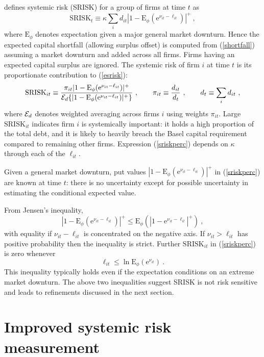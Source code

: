\documentclass[12pt]{article}
\newcommand{\E}{\mathrm{E}}
\newcommand{\e}{\mathrm{e}}
\newcommand{\Ex}{{\cal E}}
\newcommand{\Es}{\E_\phi}
\newcommand{\eref}[1]{(\ref{#1})}
\newcommand{\cq}{\ , \qquad}
\newcommand{\be}[1]{\begin{equation}\label{#1}}
\newcommand{\ee}{\end{equation}}
\begin{document}
 \cite{brownlees2015} defines  systemic risk (SRISK) for a group of firms  at time $t$ as
\be{esrisk}
\mathrm{SRISK}_t\equiv\kappa\sum_i d_{it}\left|1-\Es(\e^{\nu_{it}-\ell_{it}})\right|^+ \ ,
\ee
where  $\Es$ denotes expectation given a major general market downturn. Hence the expected capital shortfall (allowing surplus offset) is computed from \eref{shortfall} assuming a market downturn and added across all firms. Firms having an expected capital surplus are ignored. The systemic risk of firm $i$ at time $t$ is its proportionate contribution to \eref{esrisk}:
 \be{sriskperc}
 \mathrm{SRISK}_{it}\equiv \frac{\pi_{it}|1-\Es(\e^{\nu_{it}-\ell_{it}})|^+}{\Ex_d\{|1-\Es(\e^{\nu_{it}-\ell_{it}})|^+\}}\cq \pi_{it}\equiv \frac{d_{it}}{d_t}\cq d_t\equiv \sum_i d_{it}\ ,
 \ee
where $\Ex_d$ denotes weighted averaging across firms $i$ using weights $\pi_{it}$.     Large $\mathrm{SRISK}_{it}$ indicates firm $i$ is systemically important: it holds a high proportion of the total debt, and it is likely to heavily breach the Basel capital requirement compared to remaining other firms.  Expression \eref{sriskperc} depends on $\kappa$ through each of the $\ell_{it}$.

Given a general market downturn, put values $|1-\Es(\e^{\nu_{it}-\ell_{it}})|^+$  in \eref{sriskperc} are known at time $t$:  there is no uncertainty except for possible  uncertainty in estimating the conditional  expected value.

From Jensen's inequality,
$$
\left|1-\Es(\e^{\nu_{it}-\ell_{it}})\right|^+ \le\Es\left(\left|1-\e^{\nu_{it}-\ell_{it}}\right|^+\right)\ ,
$$
with equality  if  $\nu_{it}-\ell_{it}$ is concentrated on the negative axis.  If  $\nu_{it}>\ell_{it}$  has positive probability then the  inequality is strict.   Further $\mathrm{SRISK}_{it}$ in \eref{sriskperc}   is zero whenever
$$
\ell_{it}\le \ln\Es(\e^{\nu_{it}})\ .
$$
This inequality typically holds even if the expectation conditions on an extreme market downturn. The above two inequalities suggest SRISK is not risk sensitive and leads to refinements discussed in the next section.

\section{Improved systemic risk measurement}\label{improve}
\end{document}
